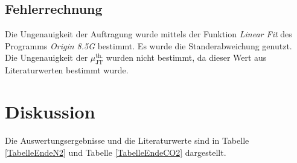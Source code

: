 \documentclass[a4paper,12pt,oneside,onecolum,final,openany]{report}
\begin{document}
\section{Fehlerrechnung}
Die Ungenauigkeit der Auftragung wurde mittels der Funktion \textit{Linear Fit} des Programms \textit{Origin 8.5G} bestimmt. Es wurde die Standerabweichung genutzt. \\
Die Ungenauigkeit der $\mu_{\text{JT}}^{\text{th.}}$ wurden nicht bestimmt, da dieser Wert aus Literaturwerten bestimmt wurde.
\chapter{Diskussion}
Die Auswertungsergebnisse und die Literaturwerte sind in Tabelle \ref{TabelleEndeN2} und Tabelle \ref{TabelleEndeCO2} dargestellt. \\
\end{document}
